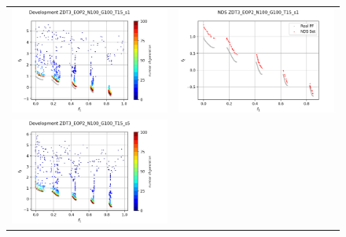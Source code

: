 
\begin{figure}[H]
    \centering
    \begin{tabular}{c c}
    \includegraphics[scale=0.45]{figures/ZDT3_EOP2_N100_G100_T15/s1_dev.png} &
    \includegraphics[scale=0.45]{figures/ZDT3_EOP2_N100_G100_T15/s1_nds.png}\\
    \includegraphics[scale=0.45]{figures/ZDT3_EOP2_N100_G100_T15/s5_dev.png} &

\end{tabular}
\end{figure}
